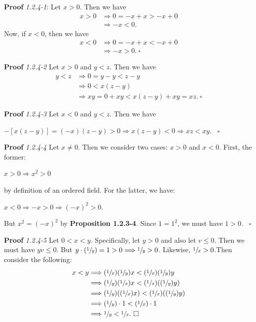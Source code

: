 \documentclass{article}
\begin{document}
\textbf{Proof} \textit{1.2.4-1}: Let $x>0$. Then we have
\begin{align*}
    x>0 &\Longrightarrow 0=-x+x>-x+0\\
    &\Longrightarrow -x<0.
\end{align*}
Now, if $x<0$, then we have 
\begin{align*}
    x<0&\Longrightarrow 0=-x+x<-x+0\\
    &\Longrightarrow -x>0. \ \square
\end{align*}

\textbf{Proof} \textit{1.2.4-2} Let $x>0$ and $y<z$. Then we have
\begin{align*}
    y<z &\Longrightarrow 0=y-y<z-y\\
    &\Longrightarrow 0<x(z-y)\\
    &\Longrightarrow xy=0+xy<x(z-y)+xy=xz. \ \square
\end{align*}

\textbf{Proof} \textit{1.2.4-3} Let $x<0$ and $y<z$. Then we have
\begin{center}
    $-[x(z-y)]=(-x)(z-y)>0 \Longrightarrow x(z-y)<0 \Longrightarrow xz<xy$. \ $\square$
\end{center}

\textbf{Proof} \textit{1.2.4-4} Let $x\neq 0$. Then we consider two cases: $x>0$ and $x<0$. First, the former:
\begin{center}
    $x>0 \Longrightarrow x^2>0$
\end{center}
by definition of an ordered field. For the latter, we have:
\begin{center}
    $x<0 \Longrightarrow -x>0 \Longrightarrow (-x)^2>0$.
\end{center}
But $x^2=(-x)^2$ by \textbf{Proposition 1.2.3-4}. Since $1=1^2$, we must have $1>0$. \ $\square$

\textbf{Proof} \textit{1.2.4-5} Let $0<x<y$. Specifically, let $y>0$ and also let $v \leq 0$. Then we must have $yv \leq 0$. But $y \cdot (\sfrac{1}{y})=1>0 \Longrightarrow \sfrac{1}{y}>0$. Likewise, $\sfrac{1}{x}>0$.Then consider the following:
\begin{align*}
    x<y &\Longrightarrow (\sfrac{1}{x})(\sfrac{1}{y})x<(\sfrac{1}{x})(\sfrac{1}{y})y\\
    &\Longrightarrow (\sfrac{1}{y})(\sfrac{1}{x})x<(\sfrac{1}{x})((\sfrac{1}{y})y)\\
    &\Longrightarrow (\sfrac{1}{y})((\sfrac{1}{x})x)<(\sfrac{1}{x})((\sfrac{1}{y})y)\\
    &\Longrightarrow (\sfrac{1}{y})\cdot 1<(\sfrac{1}{x})\cdot 1\\
    &\Longrightarrow \sfrac{1}{y}<\sfrac{1}{x}. \ \square
\end{align*}
\end{document}

